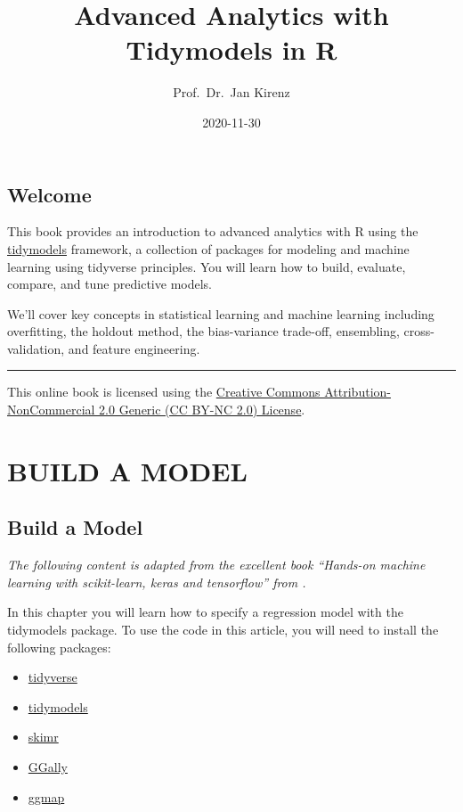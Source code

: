 \documentclass[
]{book}
\title{Advanced Analytics with Tidymodels in R}
\author{Prof.~Dr.~Jan Kirenz}
\date{2020-11-30}
\providecommand{\tightlist}{%
  \setlength{\itemsep}{0pt}\setlength{\parskip}{0pt}}
\begin{document}
\maketitle

{
\setcounter{tocdepth}{1}
\tableofcontents
}
\hypertarget{welcome}{%
\chapter*{Welcome}\label{welcome}}

This book provides an introduction to advanced analytics with R using the \href{https://tidymodels.org}{tidymodels} framework, a collection of packages for modeling and machine learning using tidyverse principles. You will learn how to build, evaluate, compare, and tune predictive models.

We'll cover key concepts in statistical learning and machine learning including overfitting, the holdout method, the bias-variance trade-off, ensembling, cross-validation, and feature engineering.

\hfill\break

\begin{center}\rule{0.5\linewidth}{0.5pt}\end{center}

This online book is licensed using the \href{https://creativecommons.org/licenses/by-nc/2.0/}{Creative Commons Attribution-NonCommercial 2.0 Generic (CC BY-NC 2.0) License}.

\hfill\break

\hypertarget{part-build-a-model}{%
\part{BUILD A MODEL}\label{part-build-a-model}}

\hypertarget{intro}{%
\chapter{Build a Model}\label{intro}}

\emph{The following content is adapted from the excellent book ``Hands-on machine learning with scikit-learn, keras and tensorflow'' from \citet{Geron2019}.}

In this chapter you will learn how to specify a regression model with the tidymodels package. To use the code in this article, you will need to install the following packages:

\begin{itemize}
\tightlist
\item
  \href{https://www.tidyverse.org/}{tidyverse}
\item
  \href{https://www.tidymodels.org/}{tidymodels}
\item
  \href{https://cran.r-project.org/web/packages/skimr/vignettes/skimr.html}{skimr}
\item
  \href{https://ggobi.github.io/ggally/index.html}{GGally}
\item
  \href{}{ggmap}
\end{itemize}
\end{document}

